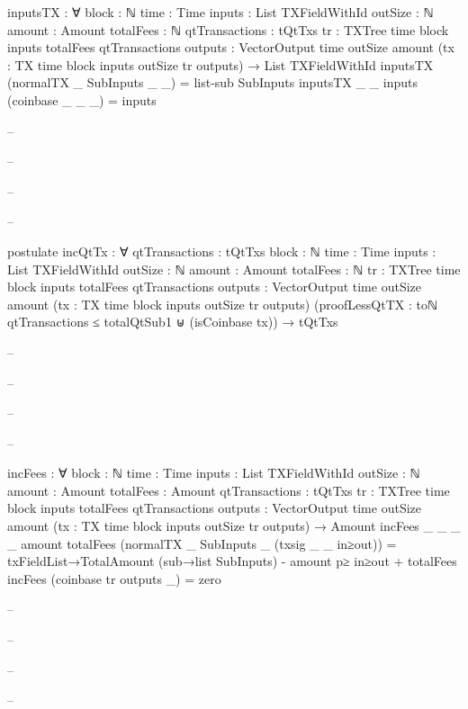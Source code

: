 \documentclass{beamer}
\begin{document}
{\begin{frame}
\begin{code}
        inputsTX : ∀ {block : ℕ} {time : Time}
          {inputs : List TXFieldWithId}
          {outSize : ℕ} {amount : Amount}
          {totalFees : ℕ} {qtTransactions : tQtTxs}
          {tr : TXTree time block inputs totalFees qtTransactions}
          {outputs : VectorOutput time outSize amount}
          (tx : TX {time} {block} {inputs} {outSize} tr outputs)
          → List TXFieldWithId
        inputsTX (normalTX _ SubInputs _ _) = list-sub SubInputs
        inputsTX {_} {_} {inputs} (coinbase _ _ _) = inputs

-- \end{code}
-- \end{frame}
-- \begin{frame}
-- \begin{code}

        postulate
          incQtTx : ∀ {qtTransactions : tQtTxs}
            {block : ℕ} {time : Time}
            {inputs : List TXFieldWithId}
            {outSize : ℕ} {amount : Amount}
            {totalFees : ℕ}
            {tr : TXTree time block inputs totalFees qtTransactions}
            {outputs : VectorOutput time outSize amount}
            (tx : TX {time} {block} {inputs} {outSize} tr outputs)
            (proofLessQtTX :
                toℕ qtTransactions ≤ totalQtSub1
                ⊎
                (isCoinbase tx))
            → tQtTxs

-- \end{code}
-- \end{frame}
-- \begin{frame}
-- \begin{code}

        incFees : ∀ {block : ℕ} {time : Time}
          {inputs : List TXFieldWithId}
          {outSize : ℕ} {amount : Amount}
          {totalFees : Amount} {qtTransactions : tQtTxs}
          {tr : TXTree time block inputs totalFees qtTransactions}
          {outputs : VectorOutput time outSize amount}
          (tx : TX {time} {block} {inputs} {outSize} tr outputs)
          → Amount
        incFees {_} {_} {_} {_} {amount} {totalFees}
          (normalTX _ SubInputs _ (txsig _ _ in≥out)) =
          txFieldList→TotalAmount (sub→list SubInputs)
          - amount p≥ in≥out
          + totalFees
        incFees (coinbase tr outputs _) = zero

-- \end{code}
-- \end{frame}
-- \begin{frame}
-- \begin{code}


\end{code}
\end{frame}}
\end{document}
